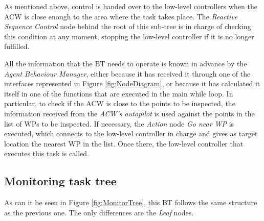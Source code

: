 \documentclass[fontsize=11pt, English=false, Español=true, Myfinal=true, twoside, numbers=noenddot]{scrbook}
\begin{document}
As mentioned above, control is handed over to the low-level controllers when the \gls{ACW} is close enough to the area where the task takes place. The \emph{Reactive Sequence Control} node behind the root of this sub-tree is in charge of checking this condition at any moment, stopping the low-level controller if it is no longer fulfilled.

All the information that the \gls{BT} needs to operate is known in advance by the \emph{Agent Behaviour Manager}, either because it has received it through one of the interfaces represented in Figure \ref{fig:NodeDiagram}, or because it has calculated it itself in one of the functions that are executed in the main while loop. In particular, to check if the \gls{ACW} is close to the points to be inspected, the information received from the \emph{\gls{ACW}'s autopilot} is used against the points in the list of \glspl{WP} to be inspected. If necessary, the \emph{Action} node \emph{Go near \gls{WP}} is executed, which connects to the low-level controller in charge and gives as target location the nearest \gls{WP} in the list. Once there, the low-level controller that executes this task is called.

\subsection{Monitoring task tree}
\label{sec:MonitoringTaskTree}
As can it be seen in Figure \ref{fig:MonitorTree}, this \gls{BT} follows the same structure as the previous one. The only differences are the \emph{Leaf} nodes.
\end{document}
